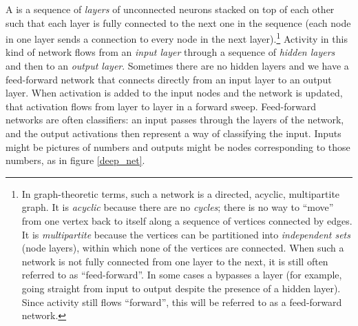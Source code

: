 A   is a sequence of \emph{layers} of unconnected neurons stacked on top of each other such that each layer is fully connected to the next one in the sequence (each node in one layer sends a connection to every node in the next layer).\footnote{\label{acyclic} In graph-theoretic terms, such a network is a directed, acyclic, multipartite graph. It is \emph{acyclic} because there are no \emph{cycles}; there is no way to ``move'' from one vertex back to itself along a sequence of vertices connected by edges. It is \emph{multipartite} because the vertices can be partitioned into \emph{independent sets} (node layers), within which none of the vertices are connected. When such a network is not fully connected from one layer to the next, it is still often referred to as ``feed-forward''. In some cases a  bypasses a layer (for example, going straight from input to output despite the presence of a hidden layer). Since activity still flows ``forward'', this will be referred to as a feed-forward network.}  Activity in this kind of network flows from an \emph{input layer} through a sequence of \emph{hidden layers} and then to an \emph{output layer}. Sometimes there are no hidden layers and we have a feed-forward network that connects directly from an input layer to an output layer.  When activation is added to the input nodes and the network is updated, that activation flows from layer to layer in a forward sweep. Feed-forward networks are often classifiers: an input passes through the layers of the network, and the output activations then represent a way of classifying the input. Inputs might be pictures of numbers and outputs might be nodes corresponding to those numbers, as in figure \ref{deep_net}.

